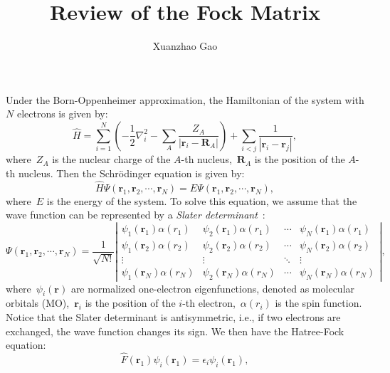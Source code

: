 \documentclass[prb,preprintnumbers,amsmath,amssymb, 11pt]{revtex4}
\newcommand{\V}[1]{\boldsymbol{#1}} %
\newcommand{\abs}[1]{\left|#1\right|} %
\begin{document}

\title{Review of the Fock Matrix}
\author{Xuanzhao Gao}

\maketitle

Under the Born-Oppenheimer approximation, the Hamiltonian of the system with $N$ electrons is given by:
\begin{equation}
    \hat{H} = \sum_{i=1}^N \left( -\frac{1}{2} \nabla_{i}^2 - \sum_{A} \frac{Z_A}{\abs{\mathbf{r}_i - \mathbf{R}_A}} \right) + \sum_{i < j} \frac{1}{|\mathbf{r}_i - \mathbf{r}_j|},
\end{equation}
where~$Z_A$ is the nuclear charge of the $A$-th nucleus,~$\mathbf{R}_A$ is the position of the $A$-th nucleus.
Then the Schrödinger equation is given by:
\begin{equation}
    \hat{H} \Psi(\mathbf{r}_1, \mathbf{r}_2, \cdots, \mathbf{r}_N) = E \Psi(\mathbf{r}_1, \mathbf{r}_2, \cdots, \mathbf{r}_N),
\end{equation}
where~$E$ is the energy of the system.
To solve this equation, we assume that the wave function can be represented by a \textit{Slater determinant}~\cite{cramer2013essentials}:
\begin{equation}
    \Psi(\mathbf{r}_1, \mathbf{r}_2, \cdots, \mathbf{r}_N) = \frac{1}{\sqrt{N!}} \left| \begin{array}{cccc}
        \psi_1(\mathbf{r}_1) \alpha(r_1) & \psi_2(\mathbf{r}_1) \alpha(r_1) & \cdots & \psi_N(\mathbf{r}_1) \alpha(r_1) \\
        \psi_1(\mathbf{r}_2) \alpha(r_2) & \psi_2(\mathbf{r}_2) \alpha(r_2) & \cdots & \psi_N(\mathbf{r}_2) \alpha(r_2) \\
        \vdots & \vdots & \ddots & \vdots \\
        \psi_1(\mathbf{r}_N) \alpha(r_N) & \psi_2(\mathbf{r}_N) \alpha(r_N) & \cdots & \psi_N(\mathbf{r}_N) \alpha(r_N)
    \end{array} \right|,
\end{equation}
where~$\psi_i(\mathbf{r})$ are normalized one-electron eigenfunctions, denoted as molecular orbitals (MO),~$\mathbf{r}_i$ is the position of the $i$-th electron,~$\alpha(r_i)$ is the spin function.
Notice that the Slater determinant is antisymmetric, i.e., if two electrons are exchanged, the wave function changes its sign.
We then have the Hatree-Fock equation:
\begin{equation}\label{eq:hatree-fock}
    \hat{F}(\V{r}_1) \psi_i(\V{r}_1) = \epsilon_i \psi_i(\V{r}_1),
\end{equation}
\end{document}
